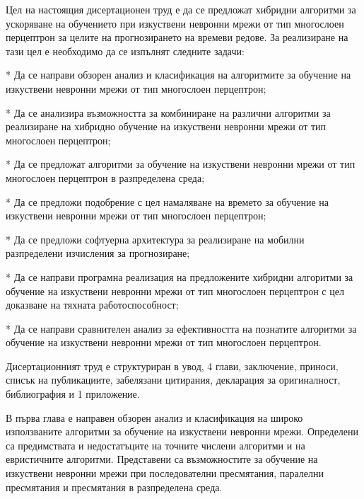 Цел на настоящия дисертационен труд е да се предложат хибридни алгоритми за ускоряване на обучението при изкуствени невронни мрежи от тип многослоен перцептрон за целите на прогнозирането на времеви редове. За реализиране на тази цел е необходимо да се изпълнят следните задачи:

*	Да се направи обзорен анализ и класификация на алгоритмите за обучение на изкуствени невронни мрежи от тип многослоен перцептрон;

*	Да се анализира възможността за комбиниране на различни алгоритми за реализиране на хибридно обучение на изкуствени невронни мрежи от тип многослоен перцептрон;

*	Да се предложат алгоритми за обучение на изкуствени невронни мрежи от тип многослоен перцептрон в разпределена среда;

*	Да се предложи подобрение с цел намаляване на времето за обучение на изкуствени невронни мрежи от тип многослоен перцептрон;

*	Да се предложи софтуерна архитектура за реализиране на мобилни разпределени изчисления за прогнозиране;

*	Да се направи програмна реализация на предложените хибридни алгоритми за обучение на изкуствени невронни мрежи от тип многослоен перцептрон с цел доказване на тяхната работоспособност;

*	Да се направи сравнителен анализ за ефективността на познатите алгоритми за обучение на изкуствени невронни мрежи от тип многослоен перцептрон.

Дисертационният труд е структуриран в увод, 4 глави, заключение, приноси, списък на публикациите, забелязани цитирания, декларация за оригиналност, библиография и 1 приложение.

В първа глава е направен обзорен анализ и класификация на широко използваните алгоритми за обучение на изкуствени невронни мрежи. Определени са предимствата и недостатъците на точните числени алгоритми и на евристичните алгоритми. Представени са възможностите за обучение на изкуствени невронни мрежи при последователни пресмятания, паралелни пресмятания и пресмятания в разпределена среда.

